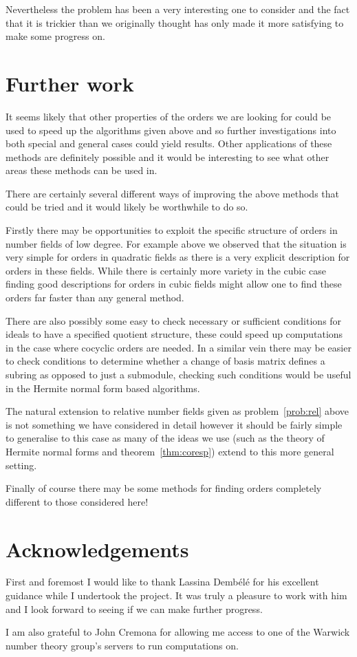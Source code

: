 \documentclass[12pt,a4paper,abstracton,bibtotoc]{scrreprt}
\theoremstyle{definition}
\begin{document}
Nevertheless the problem has been a very interesting one to consider and the fact that it is trickier than we originally thought has only made it more satisfying to make some progress on.

\section{Further work}
It seems likely that other properties of the orders we are looking for could be used to speed up the algorithms given above and so further investigations into both special and general cases could yield results.
Other applications of these methods are definitely possible and it would be interesting to see what other areas these methods can be used in.

There are certainly several different ways of improving the above methods that could be tried and it would likely be worthwhile to do so.

Firstly there may be opportunities to exploit the specific structure of orders in number fields of low degree.
For example above we observed that the situation is very simple for orders in quadratic fields as there is a very explicit description for orders in these fields.
While there is certainly more variety in the cubic case finding good descriptions for orders in cubic fields might allow one to find these orders far faster than any general method.

There are also possibly some easy to check necessary or sufficient conditions for ideals to have a specified quotient structure, these could speed up computations in the case where cocyclic orders are needed.
In a similar vein there may be easier to check conditions to determine whether a change of basis matrix defines a subring as opposed to just a submodule, checking such conditions would be useful in the Hermite normal form based algorithms.

The natural extension to relative number fields given as problem~\ref{prob:rel} above is not something we have considered in detail however it should be fairly simple to generalise to this case as many of the ideas we use (such as the theory of Hermite normal forms and theorem~\ref{thm:coresp}) extend to this more general setting.

Finally of course there may be some methods for finding orders completely different to those considered here!

\section{Acknowledgements}
First and foremost I would like to thank Lassina Demb\'el\'e for his excellent guidance while I undertook the project.
It was truly a pleasure to work with him and I look forward to seeing if we can make further progress.

I am also grateful to John Cremona for allowing me access to one of the Warwick number theory group's servers to run computations on.

\nocite{*}


\end{document}
